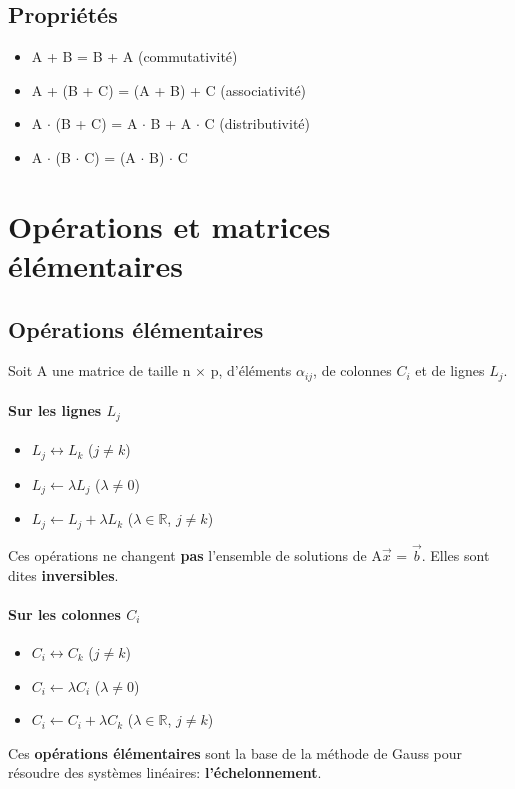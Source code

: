 \documentclass[10pt,a4paper]{book}
\newcommand{\R}{\mathbb{R}}
\newcommand{\x}{$\times$ }
\begin{document}
\subsection{Propriétés}

\begin{itemize}
\item A + B = B + A (commutativité)
\item A + (B + C) = (A + B) + C (associativité)
\item A $\cdot$ (B + C) = A $\cdot$ B + A $\cdot$ C (distributivité)
\item A $\cdot$ (B $\cdot$ C) = (A $\cdot$ B) $\cdot$ C
\end{itemize}

\section{Opérations et matrices élémentaires}

\subsection{Opérations élémentaires}

Soit A une matrice de taille n \x p, d'éléments $\alpha_{ij}$, de colonnes $C_i$ et de lignes $L_j$.
\paragraph{Sur les lignes $L_j$}
\begin{itemize}
\item $L_j \leftrightarrow L_k$ ($j \neq k$)
\item $L_j \leftarrow \lambda L_j$ ($\lambda \neq 0$)
\item $L_j \leftarrow L_j + \lambda L_k$ ($\lambda \in \R$, $j \neq k$)
\end{itemize}
Ces opérations ne changent \textbf{pas} l'ensemble de solutions de A$\vec{x}$ = $\vec{b}$. Elles sont dites \textbf{inversibles}.

\paragraph{Sur les colonnes $C_i$}
\begin{itemize}
\item $C_i \leftrightarrow C_k$ ($j \neq k$)
\item $C_i \leftarrow \lambda C_i$ ($\lambda \neq 0$)
\item $C_i \leftarrow C_i + \lambda C_k$ ($\lambda \in \R$, $j \neq k$)
\end{itemize}

Ces \textbf{opérations élémentaires} sont la base de la méthode de Gauss pour résoudre des systèmes linéaires: \textbf{l'échelonnement}.
\end{document}
